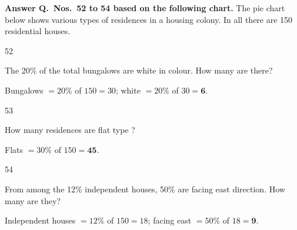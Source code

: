 \begin{context}
\textbf{Answer Q.~Nos.~52 to 54 based on the following chart.} The pie chart below shows various types of residences in a housing colony. In all there are 150 residential houses.
\begin{center}
\end{center}
\end{context}
\begin{question}{52}
{The 20\% of the total bungalows are white in colour. How many are there?\par}
\begin{explain}
Bungalows $=20\%$ of $150=30$; white $=20\%$ of $30=\mathbf{6}$.
\end{explain}
\end{question}

\begin{question}{53}
{How many residences are flat type ?\par}
\begin{explain}
Flats $=30\%$ of $150=\mathbf{45}$.
\end{explain}
\end{question}

\begin{question}{54}
{From among the 12\% independent houses, 50\% are facing east direction. How many are they?\par}
\begin{explain}
Independent houses $=12\%$ of $150=18$; facing east $=50\%$ of $18=\mathbf{9}$.
\end{explain}
\end{question}

